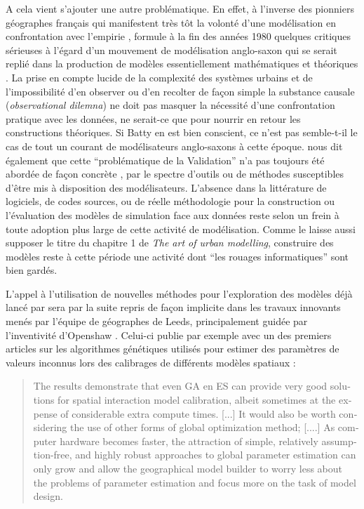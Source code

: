 A cela vient s'ajouter une autre problématique. En effet, à l'inverse des pionniers géographes français qui manifestent très tôt la volonté d'une modélisation en confrontation avec l'empirie \autocites{Pumain1983,AMORAL1983}, \textcite{Openshaw1989} formule à la fin des années 1980 quelques critiques sérieuses à l'égard d'un mouvement de modélisation anglo-saxon qui se serait replié dans la production de modèles essentiellement mathématiques et théoriques . La prise en compte lucide de la complexité des systèmes urbains et de l'impossibilité d'en observer ou d'en recolter de façon simple la substance causale (\textit{observational dilemna}) ne doit pas masquer la nécessité d'une confrontation pratique avec les données, ne serait-ce que pour nourrir en retour les constructions théoriques. Si Batty en est bien conscient, ce n'est pas semble-t-il le cas de tout un courant de modélisateurs anglo-saxons à cette époque. \textcite{Openshaw1989} nous dit également que cette \enquote{problématique de la Validation} n'a pas toujours été abordée de façon concrète , par le spectre d'outils ou de méthodes susceptibles d'être mis à disposition des modélisateurs. L'absence dans la littérature de logiciels, de codes sources, ou de réelle méthodologie pour la construction ou l'évaluation des modèles de simulation face aux données reste selon \textcite{Openshaw1989} un frein à toute adoption plus large de cette activité de modélisation. Comme le laisse aussi supposer le titre du chapitre 1 de \textcite{Batty1976} \textit{The art of urban modelling}, construire des modèles reste à cette période une activité dont \enquote{les rouages informatiques} sont bien gardés. %

L'appel à l'utilisation de nouvelles méthodes pour l'exploration des modèles déjà lancé par \textcite{Batty1976} sera par la suite repris de façon implicite dans les travaux innovants menés par l'équipe de géographes de Leeds, principalement guidée par l'inventivité d'Openshaw \autocites{Openshaw1983, Openshaw1988, Diplock1996, Turton1998}. Celui-ci publie par exemple avec \textcite{Diplock1996} un des premiers articles sur les algorithmes génétiques utilisés pour estimer des paramètres de valeurs inconnus lors des calibrages de différents modèles spatiaux :

\foreignblockquote{english}[\cite{Diplock1996}]{The results demonstrate that even GA en ES can provide very good solutions for spatial interaction model calibration, albeit sometimes at the expense of considerable extra compute times. [...] It would also be worth considering the use of other forms of global optimization method; [....] As computer hardware becomes faster, the attraction of simple, relatively assumption-free, and highly robust approaches to global parameter estimation can only grow and allow the geographical model builder to worry less about the problems of parameter estimation and focus more on the task of model design.}


